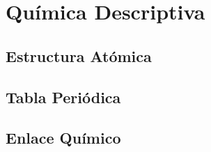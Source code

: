 \documentclass[
    11pt, %
    a4paper, %
]{

}
\begin{document}
    \newpage

    



    \part{Química Descriptiva}


    \chapterspaceabove{6.75cm} %
    \chapterspacebelow{7.25cm} %



    \chapter{Estructura Atómica}

    

    \newpage

    


    \chapter{Tabla Periódica}

    

    \newpage

    


    \chapter{Enlace Químico}

    
%
    \newpage
\end{document}
